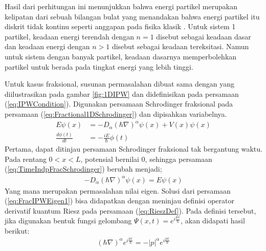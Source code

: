 Hasil dari perhitungan ini menunjukkan bahwa energi partikel merupakan kelipatan dari sebuah bilangan bulat yang menandakan bahwa energi partikel itu diskrit tidak kontinu seperti anggapan pada fisika klasik \cite{Zachos2005Quantum}. Untuk sistem 1 partikel, keadaan energi terendah dengan \(n=1\) disebut sebagai keadaan dasar dan keadaan energi dengan \(n>1\) disebut sebagai keadaan tereksitasi. Namun untuk sistem dengan banyak partikel, keadaan dasarnya memperbolehkan partikel untuk berada pada tingkat energi yang lebih tinggi. \cite{GusPur2016Kuantum}
\par Untuk kasus fraksional, susunan permasalahan dibuat sama dengan yang diilustrasikan pada gambar \ref{fig:1DIPW} dan didefinisikan pada persamaan (\ref{eq:IPWCondition}). Digunakan persamaan Schrodinger fraksional pada persamaan (\ref{eq:Fractional1DSchrodinger}) dan dipisahkan variabelnya.
\begin{align}
    E\psi(x) &= -D_\alpha (\hbar\nabla)^\alpha\psi(x) + V(x)\psi(x)  \label{eq:TimeIndpFracSchrodinger} \\
    \frac{d\phi(t)}{dt} &= -\frac{iE}{\hbar}\phi(t) \label{eq:PhiFrac}
\end{align}
Pertama, dapat ditinjau persamaan Schrodinger fraksional tak bergantung waktu. Pada rentang \(0<x<L\), potensial bernilai 0, sehingga persamaan (\ref{eq:TimeIndpFracSchrodinger}) berubah menjadi;
\begin{align}
    -D_\alpha(\hbar\nabla)^\alpha\psi(x) = E\psi(x) \label{eq:FracIPWEigen1}
\end{align}
Yang mana merupakan permasalahan nilai eigen. Solusi dari persamaan (\ref{eq:FracIPWEigen1}) bisa didapatkan dengan meninjau definisi operator derivatif kuantum Riesz pada persamaan (\ref{eq:RieszDef}). Pada definisi tersebut, jika digunakan bentuk fungsi gelombang \(\Psi(x,t) = e^{i\frac{px}{\hbar}}\), akan didapati hasil berikut:
\begin{align}
    (\hbar\nabla)^\alpha e^{i\frac{px}{\hbar}} = -|p|^\alpha e^{i\frac{px}{\hbar}} \label{eq:FracIPWEigen2}
\end{align}
